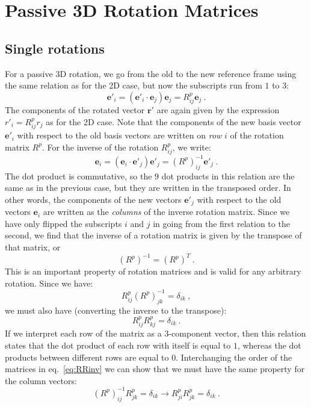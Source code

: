 \section{Passive 3D Rotation Matrices\label{sec:passive3D}}
\subsection{Single rotations}
For a passive 3D rotation, we go from the old to the new reference frame using the same relation as for the 2D case, but now the subscripts run from $1$ to $3$:
\[
	\mathbf{e}'_i = (\mathbf{e}'_i\cdot\mathbf{e}_j)\mathbf{e}_j = R^p_{ij}\mathbf{e}_j\ .
\]
The components of the rotated vector $\mathbf{r}'$ are again given by the expression $r'_i = R^p_{ij}r_j$ as for the 2D case.  Note that the components of the new basis vector $\mathbf{e}'_i$ with respect to the old basis vectors are written on \textit{row} $i$ of the rotation matrix $R^p$. For the inverse of the rotation $R^p_{ij}$, we write:
\[
	\mathbf{e}_i = (\mathbf{e}_i\cdot\mathbf{e}'_j)\mathbf{e}'_j = (R^p)^{-1}_{ij}\mathbf{e}'_j\ .
\]
The dot product is commutative, so the $9$ dot products in this relation are the same as in the previous case, but they are written in the transposed order.  In other words, the components of the new vectors $\mathbf{e}'_j$ with respect to the old vectors $\mathbf{e}_i$ are written as the \textit{columns} of the inverse rotation matrix.  Since we have only flipped the subscripts $i$ and $j$ in going from the first relation to the second, we find that the inverse of a rotation matrix is given by the transpose of that matrix, or
\[
	(R^p)^{-1} = (R^p)^T\ .
\]
This is an important property of rotation matrices and is valid for any arbitrary rotation.  Since we have:
\begin{equation}
	R^p_{ij} (R^p)^{-1}_{jk} = \delta_{ik}\ ,\label{eq:RRinv}
\end{equation}
we must also have (converting the inverse to the transpose):
\begin{equation}
	R^p_{ij} R^p_{kj} = \delta_{ik}\ .
\end{equation}
If we interpret each row of the matrix as a $3$-component vector, then this relation states that the dot product of each row with itself is equal to $1$, whereas the dot products between different rows are equal to $0$.  Interchanging the order of the matrices in eq.~\ref{eq:RRinv} we can show that we must have the same property for the column vectors:
\begin{equation}
	(R^p)^{-1}_{ij}R^p_{jk} = \delta_{ik} \rightarrow R^p_{ji} R^p_{jk} = \delta_{ik}\ .
\end{equation}
